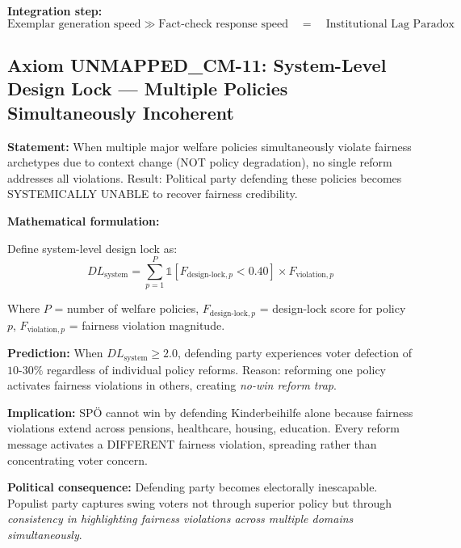 \textbf{Integration step:}
\begin{equation}
\text{Exemplar generation speed} \gg \text{Fact-check response speed} \quad = \quad \text{Institutional Lag Paradox}
\end{equation}

\subsection{Axiom UNMAPPED_CM-11: System-Level Design Lock --- Multiple Policies Simultaneously Incoherent}

\begin{tcolorbox}[colback=gray!5!white, colframe=gray!75!black,
    title=Axiom UNMAPPED_CM-11: System-Level Design Lock and Political Inescapability]

\textbf{Statement:} When multiple major welfare policies simultaneously violate fairness archetypes
due to context change (NOT policy degradation), no single reform addresses all violations. Result:
Political party defending these policies becomes SYSTEMICALLY UNABLE to recover fairness credibility.

\textbf{Mathematical formulation:}

Define system-level design lock as:
\begin{equation}
DL_{\text{system}} = \sum_{p=1}^{P} \mathbb{1}[F_{\text{design-lock},p} < 0.40] \times F_{\text{violation},p}
\end{equation}

Where $P$ = number of welfare policies, $F_{\text{design-lock},p}$ = design-lock score for policy $p$,
$F_{\text{violation},p}$ = fairness violation magnitude.

\textbf{Prediction:} When $DL_{\text{system}} \geq 2.0$, defending party experiences voter defection
of $10$-$30\%$ regardless of individual policy reforms. Reason: reforming one policy activates
fairness violations in others, creating \textit{no-win reform trap}.

\textbf{Implication:} SPÖ cannot win by defending Kinderbeihilfe alone because fairness violations
extend across pensions, healthcare, housing, education. Every reform message activates a DIFFERENT
fairness violation, spreading rather than concentrating voter concern.

\textbf{Political consequence:} Defending party becomes electorally inescapable. Populist party
captures swing voters not through superior policy but through \textit{consistency in highlighting
fairness violations across multiple domains simultaneously}.

\end{tcolorbox}

